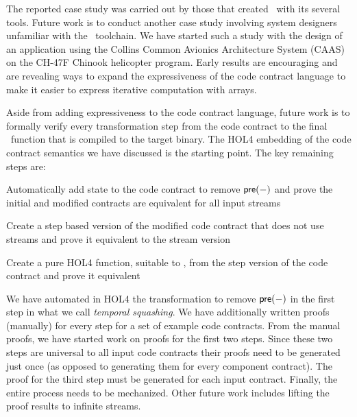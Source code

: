 The reported case study was carried out by those that created \brfcs\ with its several tools. 
Future work is to conduct another case study involving system designers unfamiliar with the \brfcs\ toolchain.
We have started such a study with the design of
an application using the Collins Common Avionics Architecture System
(CAAS)~\cite{caas} on the CH-47F Chinook helicopter program.
Early results are encouraging and are revealing ways to expand the expressiveness of the code contract language to make it easier to express iterative computation with arrays.

Aside from adding expressiveness to the code contract language, future work is to formally verify every transformation step from the code contract to the final \ckml\ function that is compiled to the target binary. 
The HOL4 embedding of the code contract semantics we have discussed is the starting point.
The key remaining steps are:
\begin{compactitem}
  \item Automatically add state to the code contract to remove $\mathsf{pre}(-)$ and prove the initial and modified contracts are equivalent for all input streams
  \item Create a step based version of the modified code contract that does not use streams and prove it equivalent to the stream version
  \item Create a pure HOL4 function, suitable to \ckml, from the step version of the code contract and prove it equivalent
\end{compactitem}
We have automated in HOL4 the transformation to remove $\mathsf{pre}(-)$ in the first step in what we call \emph{temporal squashing}.
We have additionally written proofs (manually) for every step for a set of example code contracts.
From the manual proofs, we have started work on proofs for the first two steps.
Since these two steps are universal to all input code contracts their proofs need to be generated just once (as opposed to generating them for every component contract).
The proof for the third step must be generated for each input contract. Finally, the entire process needs to be mechanized.
Other future work includes lifting the proof results to infinite streams.
